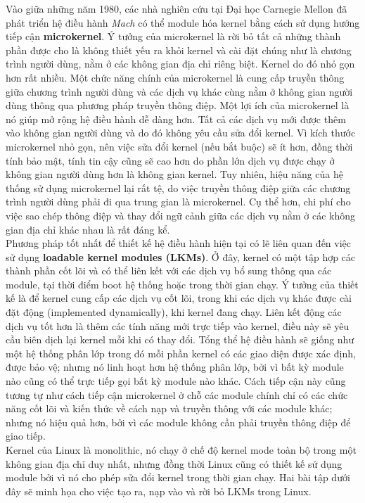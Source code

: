 \documentclass{article}
\begin{document}
Vào giữa những năm 1980, các nhà nghiên cứu tại Đại học Carnegie Mellon đã phát triển hệ điều hành \textit{Mach} có thể module hóa kernel bằng cách sử dụng hướng tiếp cận \textbf{microkernel}. Ý tưởng của microkernel là rời bỏ tất cả những thành phần được cho là không thiết yếu ra khỏi kernel và cài đặt chúng như là chương trình người dùng, nằm ở các không gian địa chỉ riêng biệt. Kernel do đó nhỏ gọn hơn rất nhiều. Một chức năng chính của microkernel là cung cấp truyền thông giữa chương trình người dùng và các dịch vụ khác cùng nằm ở không gian người dùng thông qua phương pháp truyền thông điệp. Một lợi ích của microkernel là nó giúp mở rộng hệ điều hành dễ dàng hơn. Tất cả các dịch vụ mới được thêm vào không gian người dùng và do đó không yêu cầu sửa đổi kernel. Vì kích thước microkernel nhỏ gọn, nên việc sửa đổi kernel (nếu bắt buộc) sẽ ít hơn, đồng thời tính bảo mật, tính tin cậy cũng sẽ cao hơn do phần lớn dịch vụ được chạy ở không gian người dùng hơn là không gian kernel. Tuy nhiên, hiệu năng của hệ thống sử dụng microkernel lại rất tệ, do việc truyền thông điệp giữa các chương trình người dùng phải đi qua trung gian là microkernel. Cụ thể hơn, chi phí cho việc sao chép thông điệp và thay đổi ngữ cảnh giữa các dịch vụ nằm ở các không gian địa chỉ khác nhau là rất đáng kể.
\\

Phương pháp tốt nhất để thiết kế hệ điều hành hiện tại có lẽ liên quan đến việc sử dụng \textbf{loadable kernel modules (LKMs)}. Ở đây, kernel có một tập hợp các thành phần cốt lõi và có thể liên kết với các dịch vụ bổ sung thông qua các module, tại thời điểm boot hệ thống hoặc trong thời gian chạy. Ý tưởng của thiết kế là để kernel cung cấp các dịch vụ cốt lõi, trong khi các dịch vụ khác được cài đặt động (implemented dynamically), khi kernel đang chạy. Liên kết động các dịch vụ tốt hơn là thêm các tính năng mới trực tiếp vào kernel, điều này sẽ yêu cầu biên dịch lại kernel mỗi khi có thay đổi. Tổng thể hệ điều hành sẽ giống như một hệ thống phân lớp trong đó mỗi phần kernel có các giao diện được xác định, được bảo vệ; nhưng nó linh hoạt hơn hệ thống phân lớp, bởi vì bất kỳ module nào cũng có thể trực tiếp gọi bất kỳ module nào khác. Cách tiếp cận này cũng tương tự như cách tiếp cận microkernel ở chỗ các module chính chỉ có các chức năng cốt lõi và kiến thức về cách nạp và truyền thông với các module khác; nhưng nó hiệu quả hơn, bởi vì các module không cần phải truyền thông điệp để giao tiếp.
\\

Kernel của Linux là monolithic, nó chạy ở chế độ kernel mode toàn bộ trong một không gian địa chỉ duy nhất, nhưng đồng thời Linux cũng có thiết kế sử dụng module bởi vì nó cho phép sửa đổi kernel trong thời gian chạy. Hai bài tập dưới đây sẽ minh họa cho việc tạo ra, nạp vào và rời bỏ LKMs trong Linux.
\end{document}
